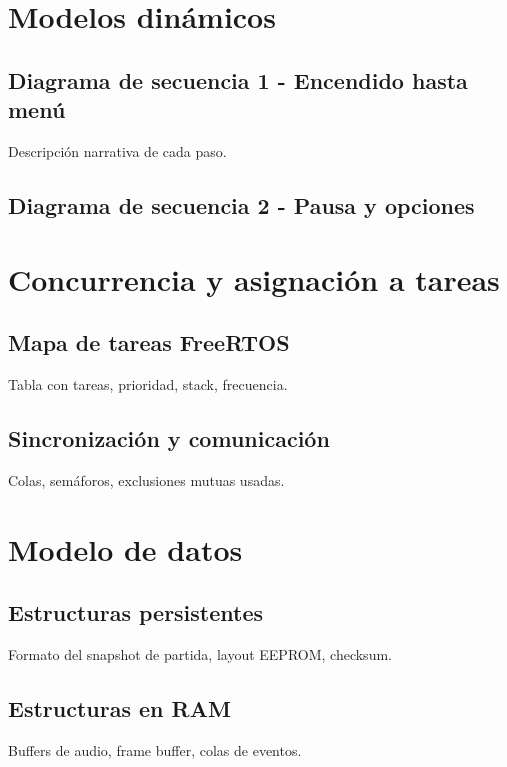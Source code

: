 \documentclass[11pt,a4paper]{article}
\begin{document}
\section{Modelos dinámicos}
\subsection{Diagrama de secuencia 1 - Encendido hasta menú}
Descripción narrativa de cada paso.

\subsection{Diagrama de secuencia 2 - Pausa y opciones}

\section{Concurrencia y asignación a tareas}
\subsection{Mapa de tareas FreeRTOS}
Tabla con tareas, prioridad, stack, frecuencia.

\subsection{Sincronización y comunicación}
Colas, semáforos, exclusiones mutuas usadas.

\section{Modelo de datos}
\subsection{Estructuras persistentes}
Formato del snapshot de partida, layout EEPROM, checksum.

\subsection{Estructuras en RAM}
Buffers de audio, frame buffer, colas de eventos.
\end{document}
